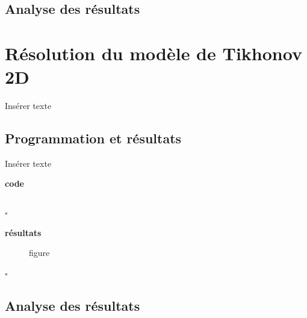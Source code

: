 \documentclass{article}
\newcommand{\debutrep}[1]{\color{blue}\begin{center} \hrulefill \textbf{ #1 } \hrulefill \end{center} }
\newcommand{\finrep}{\vspace*{5mm}\hfill $\square$\color{black}\vspace*{5mm}}
\begin{document}
\subsection{Analyse des résultats}

\clearpage


\section{Résolution du modèle de Tikhonov 2D}
Insérer texte

\subsection{Programmation et résultats}
Insérer texte
\debutrep{code}
\begin{verbatim}

\end{verbatim}
\finrep

\debutrep{résultats}
\begin{figure}[h]
\centering

\caption{figure}
\end{figure}
\finrep

\vspace*{3mm}

\subsection{Analyse des résultats}

\clearpage
\end{document}
